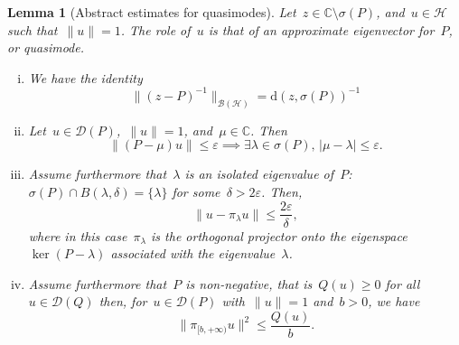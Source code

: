 \documentclass[10pt]{article}
\newcommand{\1}{\mathbbm 1}
\newtheorem{lemma}{Lemma}
\begin{document}
    \begin{lemma}[Abstract estimates for quasimodes]
        Let~$z \in \mathbb C \setminus \sigma(P)$, and~$u \in \mathcal H$ such that~$\|u\|=1$. The role of~$u$ is that of an approximate eigenvector for~$P$, or quasimode.
        \begin{enumerate}[i)]
            \item {We have the identity \begin{equation}
                \label{eq:distance_to_spectrum}
                \|(z-P)^{-1}\|_{\mathcal B(\mathcal H)} =  \mathrm{d}(z,\sigma(P))^{-1}
            \end{equation}}
            \item {Let~$u\in\mathcal D(P)$,~$\|u\|=1$, and~$\mu\in \mathbb C$. Then \begin{equation}
                \label{eq:resolvent_estimate_lambda}
                \|(P-\mu)u\| \leq \varepsilon \implies \exists \lambda\in\sigma(P),\,|\mu-\lambda|\leq \varepsilon.
            \end{equation}}
            \item {Assume furthermore that~$\lambda$ is an isolated eigenvalue of~$P$:~$\sigma(P) \cap B(\lambda,\delta) = \{\lambda\}$ for some~$\delta >2\varepsilon$. Then,
            \begin{equation}
                \label{eq:resolvent_estimate_u}
                \|u-\pi_\lambda u\| \leq \frac{2\varepsilon}{\delta},
            \end{equation}
            where in this case~$\pi_\lambda$ is the orthogonal projector onto the eigenspace~$\ker(P-\lambda)$ associated with the eigenvalue~$\lambda$.
            }
            \item{
                Assume furthermore that~$P$ is non-negative, that is~$Q(u)\geq 0$ for all~$u\in\mathcal D(Q)$  then, for~$u\in\mathcal D(P)$ with~$\|u\|=1$ and~$b>0$, we have
                \begin{equation}
                    \label{eq:spectral_markov_inequality}
                    \|\pi_{[b,+\infty)}u\|^2 \leq \frac{Q(u)}{b}.
                \end{equation}
            }
        \end{enumerate}
    \end{lemma}
\end{document}
